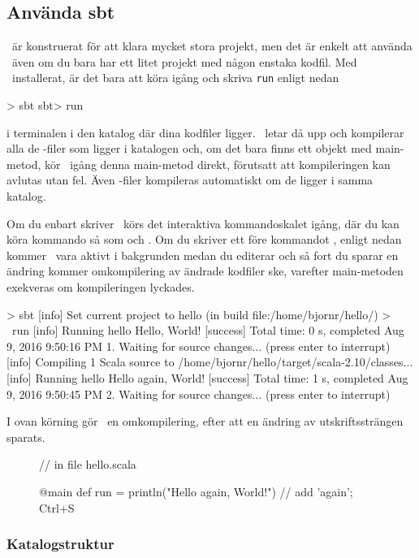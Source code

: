 \subsection{Använda sbt}
\sbt\ är konstruerat för att klara mycket stora projekt, men det är enkelt att använda \sbt\ även om du bara har ett litet projekt med någon enstaka kodfil. Med \sbt\ installerat, är det bara att köra igång \sbt och skriva \texttt{run} enligt nedan
\begin{REPLnonum}
> sbt
sbt> run
\end{REPLnonum}
i terminalen i den katalog där dina kodfiler ligger. \sbt\ letar då upp och kompilerar alla de -filer som ligger i katalogen och, om det bara finns ett objekt med main-metod, kör \sbt\ igång denna main-metod direkt, förutsatt att kompileringen kan avlutas utan fel. Även -filer kompileras automatiskt om de ligger i samma katalog.

Om du enbart skriver \sbt\ körs det interaktiva kommandoskalet igång, där du kan köra kommando så som  och . Om du skriver ett \code{~} före kommandot , enligt nedan kommer \sbt\ vara aktivt i bakgrunden medan du editerar och så fort du sparar en ändring kommer omkompilering av ändrade kodfiler ske, varefter main-metoden exekveras om kompileringen lyckades.

\begin{REPLnonum}
> sbt
[info] Set current project to hello (in build file:/home/bjornr/hello/)
> ~run
[info] Running hello
Hello, World!
[success] Total time: 0 s, completed Aug 9, 2016 9:50:16 PM
1. Waiting for source changes... (press enter to interrupt)
[info] Compiling 1 Scala source to /home/bjornr/hello/target/scala-2.10/classes...
[info] Running hello
Hello again, World!
[success] Total time: 1 s, completed Aug 9, 2016 9:50:45 PM
2. Waiting for source changes... (press enter to interrupt)
\end{REPLnonum}

\noindent I ovan körning gör \sbt\ en omkompilering, efter att en ändring av utskriftssträngen sparats.
\begin{figure}[H]
\begin{Code}
// in file hello.scala

@main def run = println("Hello again, World!") // add 'again'; Ctrl+S
\end{Code}
\end{figure}

\subsubsection{Katalogstruktur}

